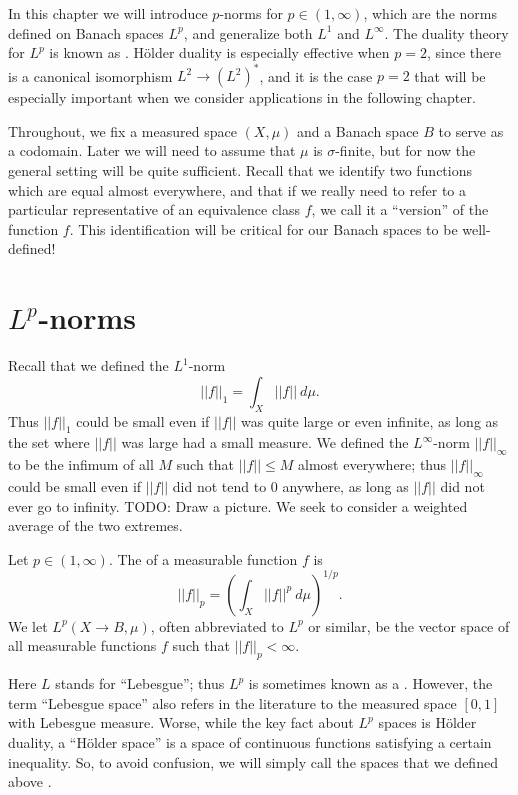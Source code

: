In this chapter we will introduce $p$-norms for $p \in (1, \infty)$, which are the norms defined on Banach spaces $L^p$, and generalize both $L^1$ and $L^\infty$.
The duality theory for $L^p$ is known as .
H\"older duality is especially effective when $p = 2$, since there is a canonical isomorphism $L^2 \to (L^2)^*$, and it is the case $p = 2$ that will be especially important when we consider applications in the following chapter.

Throughout, we fix a measured space $(X, \mu)$ and a Banach space $B$ to serve as a codomain.
Later we will need to assume that $\mu$ is $\sigma$-finite, but for now the general setting will be quite sufficient.
Recall that we identify two functions which are equal almost everywhere, and that if we really need to refer to a particular representative of an equivalence class $f$, we call it a ``version'' of the function $f$.
This identification will be critical for our Banach spaces to be well-defined!

\section{$L^p$-norms}
Recall that we defined the $L^1$-norm
\[||f||_1 = \int_{X} ||f||~d\mu.\]
Thus $||f||_1$ could be small even if $||f||$ was quite large or even infinite, as long as the set where $||f||$ was large had a small measure.
We defined the $L^\infty$-norm $||f||_\infty$ to be the infimum of all $M$ such that $||f|| \leq M$ almost everywhere; thus $||f||_\infty$ could be small even if $||f||$ did not tend to $0$ anywhere, as long as $||f||$ did not ever go to infinity.
TODO: Draw a picture.
We seek to consider a weighted average of the two extremes.

\begin{definition}
Let $p \in (1, \infty)$.
The  of a measurable function $f$ is
\begin{equation}
\label{Lp definition}
||f||_{p}  = \left(\int_{X} ||f||^{p} ~d\mu\right)^{1/p}.
\end{equation}
We let $L^p(X \to B, \mu)$, often abbreviated to $L^p$ or similar, be the vector space of all measurable functions $f$ such that $||f||_{p}  < \infty$.
\end{definition}

Here $L$ stands for ``Lebesgue''; thus $L^p$ is sometimes known as a .
However, the term ``Lebesgue space'' also refers in the literature to the measured space $[0, 1]$ with Lebesgue measure.
Worse, while the key fact about $L^p$ spaces is H\"older duality, a ``H\"older space'' is a space of continuous functions satisfying a certain inequality.
So, to avoid confusion, we will simply call the spaces that we defined above .

